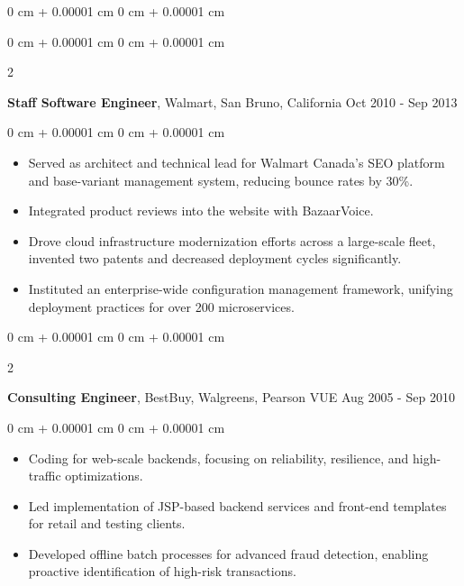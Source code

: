 \documentclass[10pt, letterpaper]{article}
\newenvironment{highlights}{
    \begin{itemize}[
        topsep=0.10 cm,
        parsep=0.10 cm,
        partopsep=0pt,
        itemsep=0pt,
        leftmargin=0 cm + 10pt
    ]
}{
    \end{itemize}
} %
\newenvironment{onecolentry}{
    \begin{adjustwidth}{
        0 cm + 0.00001 cm
    }{
        0 cm + 0.00001 cm
    }
}{
    \end{adjustwidth}
} %
\newenvironment{twocolentry}[2][]{
    \onecolentry
    \def\secondColumn{#2}
    \setcolumnwidth{\fill, 4.5 cm}
    \begin{paracol}{2}
}{
    \switchcolumn \raggedleft \secondColumn
    \end{paracol}
    \endonecolentry
} %
\begin{document}
\begin{onecolentry}
\begin{highlights}
        \vspace{0.20 cm}
        \begin{twocolentry}{
            Oct 2010 - Sep 2013
        }
            \textbf{Staff Software Engineer}, Walmart, San Bruno, California\end{twocolentry}
        \vspace{0.10 cm}
        \begin{onecolentry}
            \begin{highlights}
                \item Served as architect and technical lead for Walmart Canada's SEO platform and base-variant management system, reducing bounce rates by 30\%.
                \item Integrated product reviews into the website with BazaarVoice.
                \item Drove cloud infrastructure modernization efforts across a large-scale fleet, invented two patents and decreased deployment cycles significantly.
                \item Instituted an enterprise-wide configuration management framework, unifying deployment practices for over 200 microservices.
            \end{highlights}
        \end{onecolentry}

        \vspace{0.20 cm}
        \begin{twocolentry}{
            Aug 2005 - Sep 2010
        }
            \textbf{Consulting Engineer}, BestBuy, Walgreens, Pearson VUE\end{twocolentry}
        \vspace{0.10 cm}
        \begin{onecolentry}
            \begin{highlights}
                \item Coding for web-scale backends, focusing on reliability, resilience, and high-traffic optimizations.
                \item Led implementation of JSP-based backend services and front-end templates for retail and testing clients.
                \item Developed offline batch processes for advanced fraud detection, enabling proactive identification of high-risk transactions.
            \end{highlights}
        \end{onecolentry}


\end{highlights}
\end{onecolentry}
\end{document}
